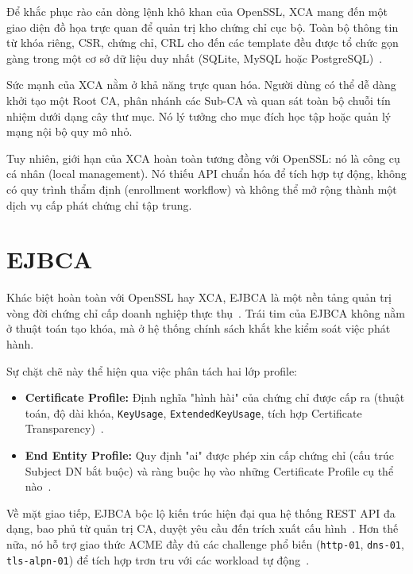 Để khắc phục rào cản dòng lệnh khô khan của OpenSSL, XCA mang đến một giao diện đồ họa trực quan để quản trị kho chứng chỉ cục bộ. Toàn bộ thông tin từ khóa riêng, CSR, chứng chỉ, CRL cho đến các template đều được tổ chức gọn gàng trong một cơ sở dữ liệu duy nhất (SQLite, MySQL hoặc PostgreSQL)~\cite{XCA}.

Sức mạnh của XCA nằm ở khả năng trực quan hóa. Người dùng có thể dễ dàng khởi tạo một Root CA, phân nhánh các Sub-CA và quan sát toàn bộ chuỗi tín nhiệm dưới dạng cây thư mục. Nó lý tưởng cho mục đích học tập hoặc quản lý mạng nội bộ quy mô nhỏ.

Tuy nhiên, giới hạn của XCA hoàn toàn tương đồng với OpenSSL: nó là công cụ cá nhân (local management). Nó thiếu API chuẩn hóa để tích hợp tự động, không có quy trình thẩm định (enrollment workflow) và không thể mở rộng thành một dịch vụ cấp phát chứng chỉ tập trung.

\section{EJBCA}
\label{sec:6.4}

Khác biệt hoàn toàn với OpenSSL hay XCA, EJBCA là một nền tảng quản trị vòng đời chứng chỉ cấp doanh nghiệp thực thụ~\cite{EJBCA}. Trái tim của EJBCA không nằm ở thuật toán tạo khóa, mà ở hệ thống chính sách khắt khe kiểm soát việc phát hành.

Sự chặt chẽ này thể hiện qua việc phân tách hai lớp profile:
\begin{itemize}
    \item \textbf{Certificate Profile:} Định nghĩa "hình hài" của chứng chỉ được cấp ra (thuật toán, độ dài khóa, \texttt{KeyUsage}, \texttt{ExtendedKeyUsage}, tích hợp Certificate Transparency)~\cite{EJBCAProfiles}.
    \item \textbf{End Entity Profile:} Quy định "ai" được phép xin cấp chứng chỉ (cấu trúc Subject DN bắt buộc) và ràng buộc họ vào những Certificate Profile cụ thể nào~\cite{EJBCAEndEntityProfiles}.
\end{itemize}

Về mặt giao tiếp, EJBCA bộc lộ kiến trúc hiện đại qua hệ thống REST API đa dạng, bao phủ từ quản trị CA, duyệt yêu cầu đến trích xuất cấu hình~\cite{EJBCAREST}. Hơn thế nữa, nó hỗ trợ giao thức ACME đầy đủ các challenge phổ biến (\texttt{http-01}, \texttt{dns-01}, \texttt{tls-alpn-01}) để tích hợp trơn tru với các workload tự động~\cite{EJBCAACME}.

